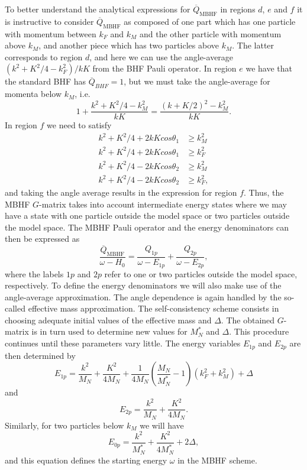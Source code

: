 To better understand the analytical expressions for
$\overline{Q}_{\mathrm{MBHF}}$ in regions
$d$, $e$ and $f$ it is instructive to consider $\overline{Q}_{\mathrm{MBHF}}$
as composed of one part which has one particle with momentum between
$k_F$ and $k_M$ and the other particle with momentum above $k_M$, and
another piece which has two particles above $k_M$. The latter corresponds
to region $d$, and here we can use the angle-average $(k^2+K^2/4-k_F^2)/kK$
from the BHF Pauli operator. In region $e$ we have that the standard BHF
has $\overline{Q}_{BHF}=1$, but we must take the angle-average for momenta below
$k_M$, i.e.\
\[
     1+\frac{k^2+K^2/4-k_M^2}{kK}=\frac{(k+K/2)^2-k_M^2}{kK}.
\]
In region $f$ we need to satisfy
\begin{eqnarray}
     k^2+K^2/4+2kKcos\theta_1 &\geq k_M^2 \nonumber\\
     k^2+K^2/4+2kKcos\theta_1 &\geq k_F^2 \nonumber\\
     k^2+K^2/4-2kKcos\theta_2 &\geq k_M^2 \nonumber\\
     k^2+K^2/4-2kKcos\theta_2 &\geq k_F^2 ,
\end{eqnarray}
and taking the angle average results in the expression for region $f$.
Thus, the MBHF $G$-matrix takes into account intermediate energy states
where we may have a state with one particle outside the model space or
two particles outside the model space.
The MBHF Pauli operator and the energy denominators can then be
expressed as
\begin{equation}
     \frac{\overline{Q}_{\mathrm{MBHF}}}{\omega -H_0}=
     \frac{Q_{1p}}{\omega - E_{1p}}
     +\frac{Q_{2p}}{\omega - E_{2p}},
\end{equation}
where the labels $1p$ and $2p$ refer to one or two particles outside the
model space, respectively. 
To define the energy denominators we will also make use of the
angle-average approximation.
The angle dependence is again handled by the
so-called effective mass approximation.
The self-consistency scheme consists in
choosing adequate initial values of the
effective mass and $\Delta$. The obtained $G$-matrix is in turn used to
determine  new values for $M_{N}^{*}$ and $\Delta$. This procedure
continues until these parameters vary little.
The energy variables $E_{1p}$ and $E_{2p}$ are then determined by
\begin{equation}
    E_{1p}= \frac{k^2}{M_N}+\frac{K^2}{4M_N}+\frac{1}{4M_N}
            \left(\frac{M_N}{M_N^*}
            -1\right) (k_F^2+k_M^2) +\Delta
\end{equation}
and 
\begin{equation}
     E_{2p}=\frac{k^2}{M_N}+\frac{K^2}{4M_N}.
\end{equation}
Similarly, for two particles below $k_M$ we will have
\begin{equation}
    E_{0p}= \frac{k^2}{M_N^*}+\frac{K^2}{4M_N^*}+2\Delta,
\end{equation}
and this equation defines the starting energy $\omega$ in the
MBHF scheme.

